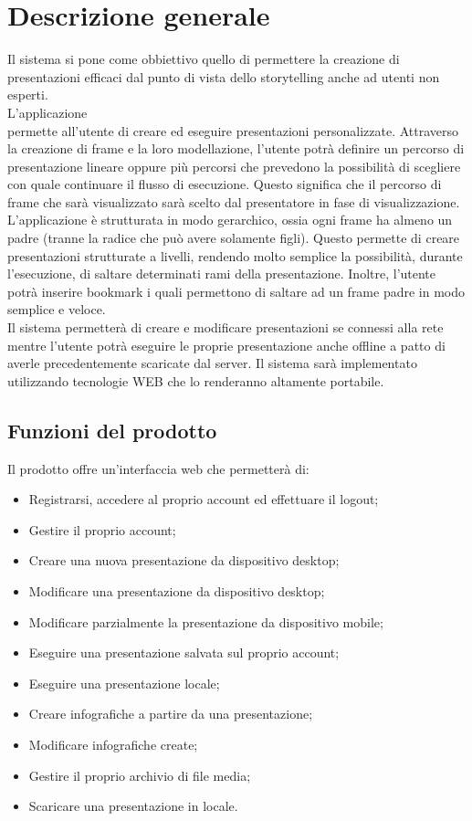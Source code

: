 \section{Descrizione generale}{
Il sistema si pone come obbiettivo quello di permettere la creazione di presentazioni efficaci dal punto di vista dello storytelling anche ad utenti non esperti. \\
L'applicazione \premi\\permette all'utente di creare ed eseguire presentazioni personalizzate. Attraverso la creazione di frame e la loro modellazione, l'utente potrà definire un percorso di presentazione lineare oppure più percorsi che prevedono la possibilità di scegliere con quale continuare il flusso di esecuzione. Questo significa che il percorso di frame che sarà visualizzato sarà scelto dal presentatore in fase di visualizzazione.\\
L'applicazione è strutturata in modo gerarchico, ossia ogni frame ha almeno un padre (tranne la radice che può avere solamente figli). Questo permette di creare presentazioni strutturate a livelli, rendendo molto semplice la possibilità, durante l'esecuzione, di saltare determinati rami della presentazione. Inoltre, l'utente potrà inserire bookmark i quali permettono di saltare ad un frame padre in modo semplice e veloce.\\
Il sistema permetterà di creare e modificare presentazioni se connessi alla rete mentre l'utente potrà eseguire le proprie presentazione anche offline a patto di averle precedentemente scaricate dal server.
Il sistema sarà implementato utilizzando tecnologie WEB che lo renderanno altamente portabile.

\subsection{Funzioni del prodotto}{
	Il prodotto offre un'interfaccia web che permetterà di:
	\begin{itemize}
		\item Registrarsi, accedere al proprio account ed effettuare il logout;
		\item Gestire il proprio account;
		\item Creare una nuova presentazione da dispositivo desktop;
		\item Modificare una presentazione da dispositivo desktop;
		\item Modificare parzialmente la presentazione da dispositivo mobile;
		\item Eseguire una presentazione salvata sul proprio account;
		\item Eseguire una presentazione locale;
		\item Creare infografiche a partire da una presentazione;
		\item Modificare infografiche create;
		\item Gestire il proprio archivio di file media;
		\item Scaricare una presentazione in locale.
	\end{itemize}
}
}
